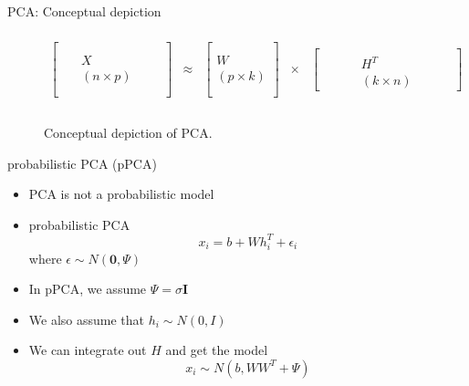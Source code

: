 \documentclass[10pt]{beamer}
\begin{document}
\begin{frame}{PCA: Conceptual depiction}

\scriptsize

\begin{figure}
\begin{centering}
\[
\begin{array}{ccccc}
\\
\left[\begin{array}{ccc}
 & \text{ }\\
\\
\text{ } & X & \text{ }\\
 & (n \times p)\text{ }\\
\\
\end{array}\right] & \approx & \left[\begin{array}{c}
\\
\\
W\\
(p\times k)\\
\\
\end{array}\right] & \times & \left[\begin{array}{ccccc}
 &  & \text{ }\\
\text{ } & \text{ } & H^T & \text{ } & \text{ }\\
 &  & (k\times n)
\end{array}\right]\\
\\
\end{array}
\]
\end{centering}
\caption{Conceptual depiction of PCA.}
\label{matrix_decomposition_view}
\end{figure}

\end{frame}


\begin{frame}{probabilistic PCA (pPCA)}

\begin{itemize}
\item PCA is not a {\color{uured} probabilistic model}\pause
\item probabilistic PCA
\[
x_i = b +  W h_i^T + \epsilon_i
\]
where $\epsilon \sim N(\mathbf{0}, \Psi)$
\item In pPCA, we assume $\Psi = \sigma \mathbf{I}$
\item We also assume that $h_i \sim N(0, I)$\pause
\item We can integrate out $H$ and get the model
\[
x_i \sim N(b, W W^T + \Psi)
\]
\end{itemize}

\end{frame}
\end{document}
